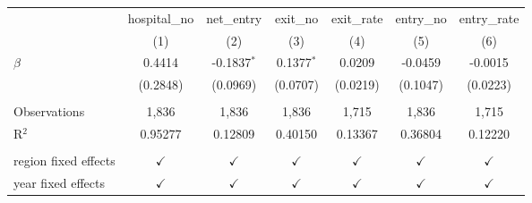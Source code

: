 \begingroup
\centering
\begin{tabular}{lcccccc}
   \toprule
                        & hospital\_no  & net\_entry    & exit\_no      & exit\_rate    & entry\_no     & entry\_rate\\   
                        & (1)           & (2)           & (3)           & (4)           & (5)           & (6)\\  
   \midrule 
   $\beta$              & 0.4414        & -0.1837$^{*}$ & 0.1377$^{*}$  & 0.0209        & -0.0459       & -0.0015\\   
                        & (0.2848)      & (0.0969)      & (0.0707)      & (0.0219)      & (0.1047)      & (0.0223)\\   
    \\
   Observations         & 1,836         & 1,836         & 1,836         & 1,715         & 1,836         & 1,715\\  
   R$^2$                & 0.95277       & 0.12809       & 0.40150       & 0.13367       & 0.36804       & 0.12220\\  
    \\
   region fixed effects & $\checkmark$  & $\checkmark$  & $\checkmark$  & $\checkmark$  & $\checkmark$  & $\checkmark$\\   
   year fixed effects   & $\checkmark$  & $\checkmark$  & $\checkmark$  & $\checkmark$  & $\checkmark$  & $\checkmark$\\   
   \bottomrule
\end{tabular}
\par\endgroup
